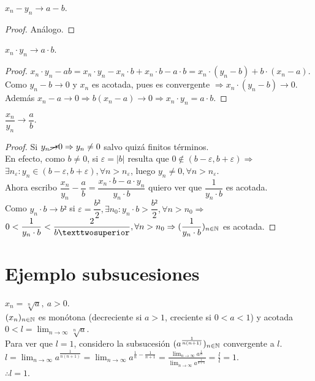 \begin{prop}
  $x_n - y_n \to a-b$.
  \begin{proof}
    Análogo.
  \end{proof}
\end{prop}

\begin{prop}
  $x_n \cdot y_n \to a \cdot b$.
  \begin{proof}
    $x_n \cdot y_n - ab = x_n \cdot y_n - x_n \cdot b + x_n \cdot b - a \cdot b = x_n \cdot (y_n - b) + b \cdot (x_n - a)$. \\
    Como $y_n - b \to 0$ y $x_n$ es acotada, pues es convergente $\Rightarrow x_n \cdot (y_n-b) \to 0$.
    Además $x_n - a \to 0 \Rightarrow b(x_n - a) \to 0 \Rightarrow x_n \cdot y_n = a \cdot b$. 
  \end{proof}
\end{prop}

\begin{prop}
  $\dfrac{x_n}{y_n} \to \dfrac{a}{b}$.
  \begin{proof}
    Si $y_n \cancel{\to} 0 \Rightarrow y_n \neq 0$ salvo quizá finitos términos. \\
    En efecto, como $b \neq 0$, si $\varepsilon = |b|$ resulta que $0 \notin (b - \varepsilon, b + \varepsilon) \Rightarrow$ \\
    $\exists n_{\varepsilon} : y_n \in (b-\varepsilon, b+\varepsilon), \forall n > n_{\varepsilon}$, luego $y_n \neq 0, \forall n > n_{\varepsilon}$. \\

    Ahora escribo $\dfrac{x_n}{y_n} - \dfrac{a}{b} = \dfrac{x_n \cdot b - a \cdot y_n}{y_n \cdot b}$ quiero ver que $\dfrac{1}{y_n \cdot b}$ es acotada. \\
    Como $y_n \cdot b \to b²$ si $\varepsilon = \dfrac{b²}{2}, \exists n_0 : y_n \cdot b > \dfrac{b²}{2}, \forall n > n_0 \Rightarrow$ \\
    $0 < \dfrac{1}{y_n \cdot b} < \dfrac{2}{b²}, \forall n > n_0 \Rightarrow (\dfrac{1}{y_n \cdot b})_{n \in \N}$ es acotada.
  \end{proof}
\end{prop}

\section{Ejemplo subsucesiones}

\begin{eg}
  $x_n = \sqrt[n]{a}, \ a > 0$. \\
  $(x_n)_{n \in \mathbb{N}}$ es monótona (decreciente si $a > 1$, creciente si $0 < a < 1$) y acotada $0 < l = \lim_{n \to \infty} \sqrt[n]{a}$. \\
  Para ver que $l = 1$, considero la subsucesión $(a^{\frac{1}{n(n+1)}})_{n \in \mathbb{N}}$ convergente a $l$. \\
  $l = \lim_{n \to \infty} a^{\frac{1}{n(n+1)}} = \lim_{n \to \infty} a^{\frac{1}{n} - \frac{1}{n+1}} = 
  \frac{\lim_{n \to \infty} a^{\frac{1}{n}}}{\lim_{n \to \infty} a^{\frac{1}{n+1}}} = \frac{l}{l} = 1.$ \\
  $\therefore l = 1$.
\end{eg}


